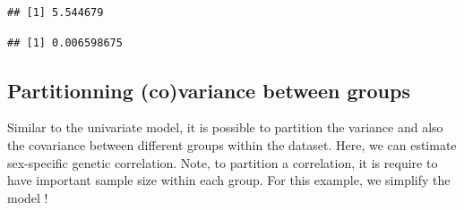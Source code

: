 \documentclass[
  12pt,
]{book}
\newenvironment{Shaded}{\begin{snugshade}}{\end{snugshade}}
\newcommand{\AttributeTok}[1]{\textcolor[rgb]{0.77,0.63,0.00}{#1}}
\newcommand{\DecValTok}[1]{\textcolor[rgb]{0.00,0.00,0.81}{#1}}
\newcommand{\FloatTok}[1]{\textcolor[rgb]{0.00,0.00,0.81}{#1}}
\newcommand{\FunctionTok}[1]{\textcolor[rgb]{0.00,0.00,0.00}{#1}}
\newcommand{\NormalTok}[1]{#1}
\newcommand{\SpecialCharTok}[1]{\textcolor[rgb]{0.00,0.00,0.00}{#1}}
\begin{document}
\begin{Shaded}
\end{Shaded}

\begin{verbatim}
## [1] 5.544679
\end{verbatim}

\begin{Shaded}
\end{Shaded}

\begin{verbatim}
## [1] 0.006598675
\end{verbatim}

\hypertarget{partitionning-covariance-between-groups}{%
\subsection{Partitionning (co)variance between groups}\label{partitionning-covariance-between-groups}}

Similar to the univariate model, it is possible to partition the variance and also the covariance between different groups within the dataset. Here, we can estimate sex-specific genetic correlation.
Note, to partition a correlation, it is require to have important sample size within each group. For this example, we simplify the model !
\end{document}
